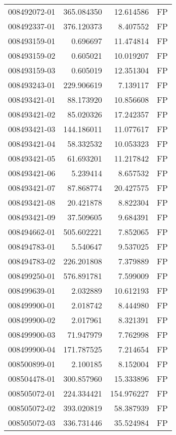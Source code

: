 \begin{tabular}{lrrl}
008492072-01 &  365.084350 &    12.614586 &   FP \\
008492337-01 &  376.120373 &     8.407552 &   FP \\
008493159-01 &    0.696697 &    11.474814 &   FP \\
008493159-02 &    0.605021 &    10.019207 &   FP \\
008493159-03 &    0.605019 &    12.351304 &   FP \\
008493243-01 &  229.906619 &     7.139117 &   FP \\
008493421-01 &   88.173920 &    10.856608 &   FP \\
008493421-02 &   85.020326 &    17.242357 &   FP \\
008493421-03 &  144.186011 &    11.077617 &   FP \\
008493421-04 &   58.332532 &    10.053323 &   FP \\
008493421-05 &   61.693201 &    11.217842 &   FP \\
008493421-06 &    5.239414 &     8.657532 &   FP \\
008493421-07 &   87.868774 &    20.427575 &   FP \\
008493421-08 &   20.421878 &     8.822304 &   FP \\
008493421-09 &   37.509605 &     9.684391 &   FP \\
008494662-01 &  505.602221 &     7.852065 &   FP \\
008494783-01 &    5.540647 &     9.537025 &   FP \\
008494783-02 &  226.201808 &     7.379889 &   FP \\
008499250-01 &  576.891781 &     7.599009 &   FP \\
008499639-01 &    2.032889 &    10.612193 &   FP \\
008499900-01 &    2.018742 &     8.444980 &   FP \\
008499900-02 &    2.017961 &     8.321391 &   FP \\
008499900-03 &   71.947979 &     7.762998 &   FP \\
008499900-04 &  171.787525 &     7.214654 &   FP \\
008500899-01 &    2.100185 &     8.152004 &   FP \\
008504478-01 &  300.857960 &    15.333896 &   FP \\
008505072-01 &  224.334421 &   154.976227 &   FP \\
008505072-02 &  393.020819 &    58.387939 &   FP \\
008505072-03 &  336.731446 &    35.524984 &   FP \\

\end{tabular}
